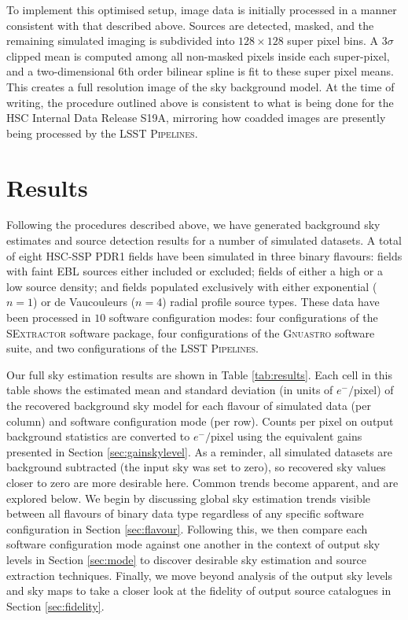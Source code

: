\documentclass[fleqn,usenatbib,useAMS]{mnras}
\newcommand*{\SExtractor}{\textsc{SExtractor}\xspace}
\newcommand*{\Gnuastro}{\textsc{Gnuastro}\xspace}
\newcommand*{\LSSTPs}{\textsc{LSST Pipelines}\xspace}
\begin{document}
To implement this optimised setup, image data is initially processed in a manner consistent with that described above. Sources are detected, masked, and the remaining simulated imaging is subdivided into $128\times128$ super pixel bins. A $3\sigma$ clipped mean is computed among all non-masked pixels inside each super-pixel, and a two-dimensional 6th order bilinear spline is fit to these super pixel means. This creates a full resolution image of the sky background model. At the time of writing, the procedure outlined above is consistent to what is being done for the HSC Internal Data Release S19A, mirroring how coadded images are presently being processed by the \LSSTPs. 

\section{Results}
\label{sec:results}

Following the procedures described above, we have generated background sky estimates and source detection results for a number of simulated datasets. A total of eight HSC-SSP PDR1 fields have been simulated in three binary flavours: fields with faint EBL sources either included or excluded; fields of either a high or a low source density; and fields populated exclusively with either exponential ($n=1$) or de Vaucouleurs ($n=4$) radial profile source types. These data have been processed in $10$ software configuration modes: four configurations of the \SExtractor software package, four configurations of the \Gnuastro software suite, and two configurations of the \LSSTPs. 

Our full sky estimation results are shown in Table \ref{tab:results}. Each cell in this table shows the estimated mean and standard deviation (in units of $e^{-}/\textrm{pixel}$) of the recovered background sky model for each flavour of simulated data (per column) and software configuration mode (per row). Counts per pixel on output background statistics are converted to $e^{-}/\textrm{pixel}$ using the equivalent gains presented in Section \ref{sec:gainskylevel}. As a reminder, all simulated datasets are background subtracted (the input sky was set to zero), so recovered sky values closer to zero are more desirable here. Common trends become apparent, and are explored below. We begin by discussing global sky estimation trends visible between all flavours of binary data type regardless of any specific software configuration in Section \ref{sec:flavour}. Following this, we then compare each software configuration mode against one another in the context of output sky levels in Section \ref{sec:mode} to discover desirable sky estimation and source extraction techniques. Finally, we move beyond analysis of the output sky levels and sky maps to take a closer look at the fidelity of output source catalogues in Section \ref{sec:fidelity}.
\end{document}
